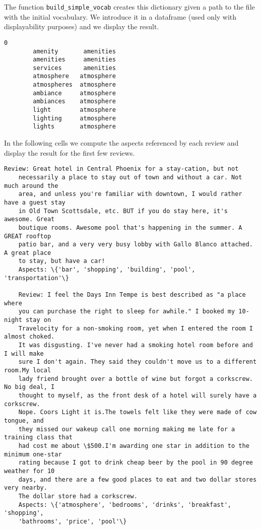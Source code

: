 \documentclass[11pt]{article}
\makeatletter
\newcommand{\boxspacing}{\kern\kvtcb@left@rule\kern\kvtcb@boxsep}
\newcommand{\prompt}[4]{
        {\ttfamily\llap{{\color{#2}[#3]:\hspace{3pt}#4}}\vspace{-\baselineskip}}
    }
\makeatother
\begin{document}
The function \texttt{build\_simple\_vocab} creates this dictionary given
a path to the file with the initial vocabulary. We introduce it in a
dataframe (used only with displayability purposes) and we display the
result.

\begin{tcolorbox}[breakable, size=fbox, boxrule=.5pt, pad at break*=1mm, opacityfill=0]
    \prompt{Out}{outcolor}{3}{\boxspacing}
    \begin{Verbatim}[commandchars=\\\{\}]
        0
        amenity       amenities
        amenities     amenities
        services      amenities
        atmosphere   atmosphere
        atmospheres  atmosphere
        ambiance     atmosphere
        ambiances    atmosphere
        light        atmosphere
        lighting     atmosphere
        lights       atmosphere
    \end{Verbatim}
\end{tcolorbox}

In the following cells we compute the aspects referenced by each review
and display the result for the first few reviews.


\begin{Verbatim}[commandchars=\\\{\}]
    Review: Great hotel in Central Phoenix for a stay-cation, but not
    necessarily a place to stay out of town and without a car. Not much around the
    area, and unless you're familiar with downtown, I would rather have a guest stay
    in Old Town Scottsdale, etc. BUT if you do stay here, it's awesome. Great
    boutique rooms. Awesome pool that's happening in the summer. A GREAT rooftop
    patio bar, and a very very busy lobby with Gallo Blanco attached. A great place
    to stay, but have a car!
    Aspects: \{'bar', 'shopping', 'building', 'pool', 'transportation'\}

    Review: I feel the Days Inn Tempe is best described as "a place where
    you can purchase the right to sleep for awhile." I booked my 10-night stay on
    Travelocity for a non-smoking room, yet when I entered the room I almost choked.
    It was disgusting. I've never had a smoking hotel room before and I will make
    sure I don't again. They said they couldn't move us to a different room.My local
    lady friend brought over a bottle of wine but forgot a corkscrew. No big deal, I
    thought to myself, as the front desk of a hotel will surely have a corkscrew.
    Nope. Coors Light it is.The towels felt like they were made of cow tongue, and
    they missed our wakeup call one morning making me late for a training class that
    had cost me about \$500.I'm awarding one star in addition to the minimum one-star
    rating because I got to drink cheap beer by the pool in 90 degree weather for 10
    days, and there are a few good places to eat and two dollar stores very nearby.
    The dollar store had a corkscrew.
    Aspects: \{'atmosphere', 'bedrooms', 'drinks', 'breakfast', 'shopping',
    'bathrooms', 'price', 'pool'\}

\end{Verbatim}
\end{document}
